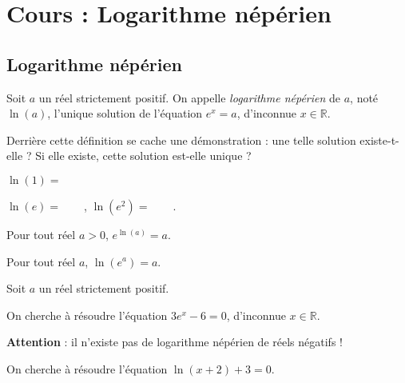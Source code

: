 \documentclass[11pt,fleqn, openany]{book} %
\begin{document}


\chapter{Cours : Logarithme népérien}

\section{Logarithme népérien}

\begin{definition} Soit $a$ un réel strictement positif. On appelle \textit{logarithme népérien} de $a$, noté $\ln (a)$, l'unique solution de l'équation $e^x =a$, d'inconnue $x \in \mathbb{R}$.\end{definition}

\begin{demonstration}Derrière cette définition se cache une démonstration : une telle solution existe-t-elle ? Si elle existe, cette solution est-elle unique ?

\vskip50pt
\end{demonstration}

\begin{example}$\ln (1)=$\end{example}

\begin{example} $\ln(e)=\qquad$, $\ln(e^2)=\qquad$.\end{example}

\begin{proposition}Pour tout réel $a>0$, $e^{\ln (a)} = a$.

Pour tout réel $a$, $\ln(e^a)=a$.

\end{proposition}

\begin{demonstration}Soit $a$ un réel strictement positif. 
\vskip50pt
\end{demonstration}


\begin{example}On cherche à résoudre l'équation $3e^x-6=0$, d'inconnue $x\in \mathbb{R}$. 

\vskip50pt
\end{example}


\textbf{Attention} : il n'existe pas de logarithme népérien de réels négatifs !

\begin{example}On cherche à résoudre l'équation $\ln(x+2)+3=0$. 

\vskip50pt
\end{example}
\newpage
\end{document}

